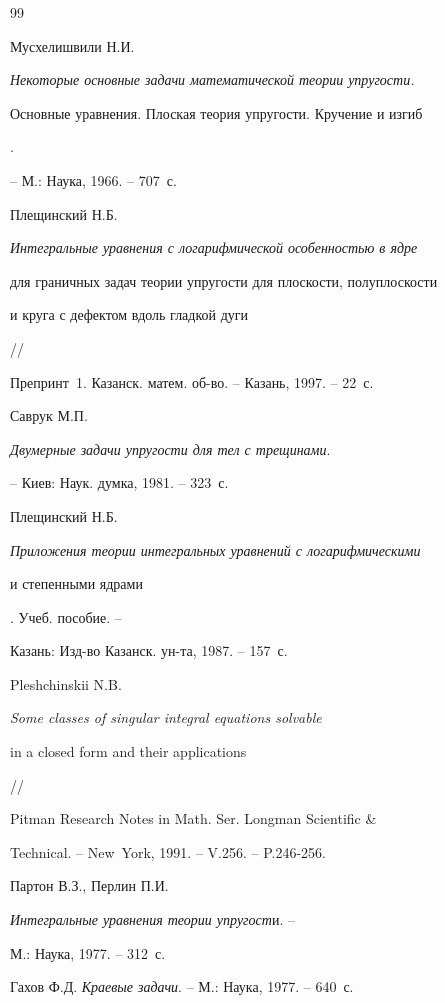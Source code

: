 \begin{thebibliography}{99}







Мусхелишвили Н.И.


{\em Некоторые основные задачи математической теории упругости.


Основные уравнения. Плоская теория упругости. Кручение и изгиб}.


-- М.: Наука, 1966. -- 707~с.




Плещинский Н.Б.


{\em Интегральные уравнения с логарифмической особенностью в ядре


для граничных задач теории упругости для плоскости, полуплоскости


и круга с дефектом вдоль гладкой дуги} //


Препринт \No\,1. Казанск. матем. об-во. -- Казань, 1997. -- 22~с.




Саврук М.П.


{\em Двумерные задачи упругости для тел с трещинами}.


-- Киев: Наук. думка, 1981. -- 323~с.




Плещинский Н.Б.


{\em Приложения теории интегральных уравнений с логарифмическими


и степенными ядрами}. Учеб. пособие. --


Казань: Изд-во Казанск. ун-та, 1987. -- 157~с.




Pleshchinskii N.B.


{\em Some classes of singular integral equations solvable


in a closed form and their applications} //


Pitman Research Notes in Math. Ser. Longman Scientific \&{}


Technical. -- New~York, 1991. -- V.256. -- P.246-256.




Партон В.З., Перлин П.И.


{\em Интегральные уравнения теории упругост}и. --


М.: Наука, 1977. -- 312~с.




Гахов Ф.Д. {\em Краевые задачи}. -- М.: Наука, 1977. -- 640~с.





\end{thebibliography}





\vskip 2cm












\label{end}





